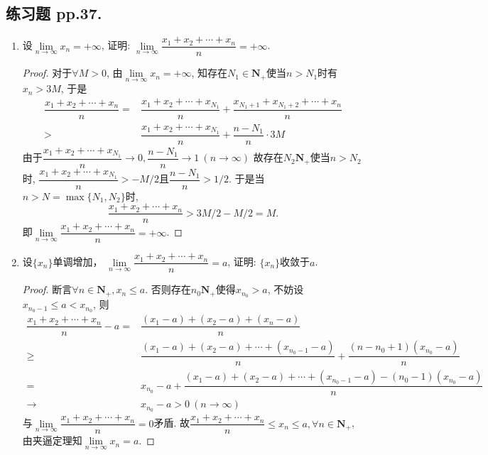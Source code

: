 \documentclass[a4paper,11pt,twoside]{ctexbook}
\begin{document}
\subsection{练习题 pp.37.}
\begin{enumerate}
	\item 设$\lim\limits_{n\to\infty} x_n=+\infty$, 证明: $\lim\limits_{n\to\infty} \dfrac{x_1+x_2+\cdots+x_n}{n}=+\infty$.
	      \begin{proof}
		      对于$\forall M>0$, 由$\lim\limits_{n\to\infty} x_n=+\infty$, 知存在$N_1\in\mathbf{N}_{+}$使当$n>N_1$时有$x_n>3M$, 于是
		      \begin{equation*}
			      \begin{split}
				      \dfrac{x_1+x_2+\cdots+x_n}{n}=&\dfrac{x_1+x_2+\cdots+x_{N_1}}{n}+\dfrac{x_{N_1+1}+x_{N_1+2}+\cdots+x_n}{n}\\
				      >&\dfrac{x_1+x_2+\cdots+x_{N_1}}{n}+\dfrac{n-N_1}{n}\cdot 3M
			      \end{split}
		      \end{equation*}
		      由于$\dfrac{x_1+x_2+\cdots+x_{N_1}}{n}\to 0, \dfrac{n-N_1}{n}\to 1\ (n\to\infty)$ 故存在$N_2\mathbf{N}_{+}$使当$n>N_2$时, $\dfrac{x_1+x_2+\cdots+x_{N_1}}{n}>-M/2$且$\dfrac{n-N_1}{n}>1/2$. 于是当$n>N=\max\{N_1,N_2\}$时,
		      \[
			      \dfrac{x_1+x_2+\cdots+x_n}{n}>3M/2-M/2=M.
		      \]
		      即$\lim\limits_{n\to\infty} \dfrac{x_1+x_2+\cdots+x_n}{n}=+\infty$.\qedhere
	      \end{proof}
	\item 设$\{x_n\}$单调增加， $\lim\limits_{n\to\infty} \dfrac{x_1+x_2+\cdots+x_n}{n}=a$, 证明: $\{x_n\}$收敛于$a$.
	      \begin{proof}
		      断言$\forall n\in\mathbf{N}_{+}, x_n\leqslant a$. 否则存在$n_0\mathbf{N}_{+}$使得$x_{n_0}>a$, 不妨设$x_{n_0-1}\leqslant a<x_{n_0}$, 则
		      \begin{equation*}
			      \begin{split}
				      \dfrac{x_1+x_2+\cdots+x_n}{n}-a=&\dfrac{(x_1-a)+(x_2-a)+(x_n-a)}{n}\\
				      \geqslant& \dfrac{(x_1-a)+(x_2-a)+\cdots+(x_{n_0-1}-a)}{n}+\dfrac{(n-n_0+1)(x_{n_0}-a)}{n}\\
				      =& x_{n_0}-a+\dfrac{(x_1-a)+(x_2-a)+\cdots+(x_{n_0-1}-a)-(n_0-1)(x_{n_0}-a)}{n}\\
				      \to& x_{n_0}-a>0\ (n\to\infty)
			      \end{split}
		      \end{equation*}
		      与$\lim\limits_{n\to\infty} \dfrac{x_1+x_2+\cdots+x_n}{n}=0$矛盾. 故$\dfrac{x_1+x_2+\cdots+x_n}{n}\leqslant x_n\leqslant a, \forall n\in\mathbf{N}_{+}$, 由夹逼定理知$\lim\limits_{n\to\infty} x_n=a$.\qedhere

\end{proof}
\end{enumerate}
\end{document}
